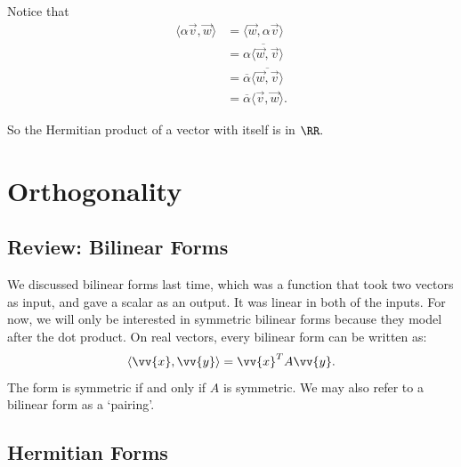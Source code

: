 Notice that 
\begin{align*}
    \langle \alpha \vec{v}, \vec{w} \rangle &= \langle \vec{w}, \alpha \vec{v} \rangle \\
    &= \overline{\alpha \langle \vec{w}, \vec{v} \rangle} \\
    &= \overline{\alpha} \overline{\langle \vec{w}, \vec{v} \rangle} \\
    &= \overline{\alpha} \langle \vec{v}, \vec{w} \rangle.
\end{align*}

So the Hermitian product of a vector with itself is in $\RR.$
\newpage


\section{Orthogonality}
\subsection{Review: Bilinear Forms}
We discussed bilinear forms last time, which was a function that took two vectors as input, and gave a scalar as an output. 
It was linear in both of the inputs.
For now, we will only be interested in symmetric bilinear forms because they model after the dot product. 
On real vectors, every bilinear form can be written as:
\[ \langle \vv{x}, \vv{y} \rangle = \vv{x}^T A \vv{y}.\]
The form is symmetric if and only if $A$ is symmetric. 
We may also refer to a bilinear form as a `pairing'. 

\subsection{Hermitian Forms}

